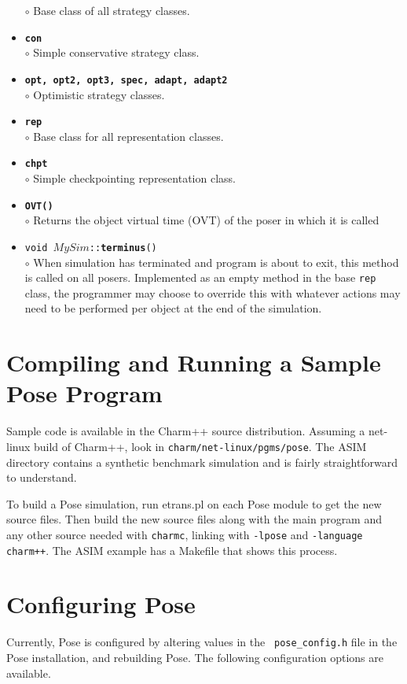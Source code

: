 \documentclass[10pt]{article}
\newcommand{\pose}{{\sc Pose}}
\begin{document}
\begin{itemize}
	$\circ$ Base class of all strategy classes.
\item {\tt {\bf con}}\\
	$\circ$ Simple conservative strategy class.
\item {\tt {\bf opt, opt2, opt3, spec, adapt, adapt2}}\\
	$\circ$ Optimistic strategy classes.
\item {\tt {\bf rep}}\\
	$\circ$ Base class for all representation classes.
\item {\tt {\bf chpt}}\\
	$\circ$ Simple checkpointing representation class.
\item {\tt {\bf OVT()}}\\
	$\circ$ Returns the object virtual time (OVT) of the poser in
	which it is called
\item {\tt void $MySim$::{\bf terminus}()}\\
	$\circ$ When simulation has terminated and program is about to exit, this method is called on all posers.  Implemented as an empty method in the base {\tt rep} class, the programmer may choose to override this with whatever actions may need to be performed per object at the end of the simulation.
\end{itemize}

\section{Compiling and Running a Sample \pose{} Program}

Sample code is available in the Charm++ source distribution.  Assuming a
net-linux build of Charm++, look in {\tt charm/net-linux/pgms/pose}.
The ASIM directory contains a synthetic benchmark simulation and is
fairly straightforward to understand.

To build a \pose{} simulation, run {etrans.pl} on each \pose{} module
to get the new source files.  Then build the new source files along with the
main program and any other source needed with {\tt charmc}, linking
with {\tt -lpose} and {\tt -language charm++}.  The ASIM example has a
Makefile that shows this process.

\section{Configuring \pose{}}

Currently, \pose{} is configured by altering values in the {\tt
pose\_config.h} file in the \pose{} installation, and rebuilding
\pose{}.  The following configuration options are available.
\end{document}
